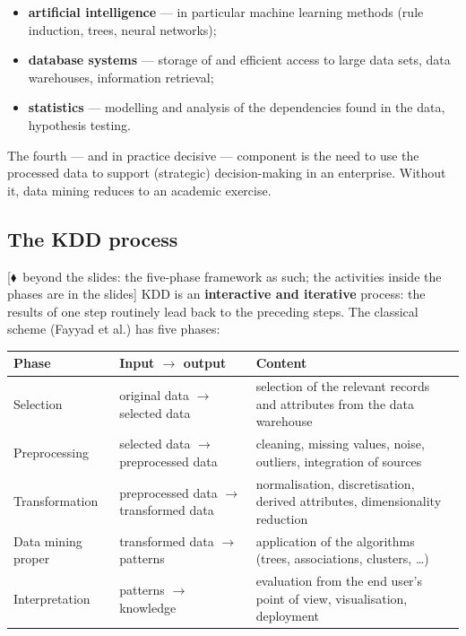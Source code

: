 \documentclass[11pt,a4paper]{article}
\theoremstyle{definition}
\newcommand{\mimoq}[1]{\textcolor{markcol}{\textsf{\footnotesize[$\blacklozenge$~beyond the slides: #1]}}}
\begin{document}
\begin{itemize}
\item \textbf{artificial intelligence} --- in particular machine learning methods (rule
      induction, trees, neural networks);
\item \textbf{database systems} --- storage of and efficient access to large data sets, data
      warehouses, information retrieval;
\item \textbf{statistics} --- modelling and analysis of the dependencies found in the data,
      hypothesis testing.
\end{itemize}

The fourth --- and in practice decisive --- component is the need to use the processed data to
support (strategic) decision-making in an enterprise. Without it, data mining reduces
to an academic exercise.

\subsection{The KDD process}

\mimoq{the five-phase framework as such; the activities inside the phases are in the slides}
KDD is an \textbf{interactive and iterative} process: the results of
one step routinely lead back to the preceding steps. The classical scheme (Fayyad et al.) has
five phases:

\begin{center}
\small
\begin{tabular}{@{}p{3.3cm}p{4.2cm}p{7.6cm}@{}}
\toprule
\textbf{Phase} & \textbf{Input $\to$ output} & \textbf{Content} \\
\midrule
Selection & original data $\to$ selected data & selection of the relevant records and
  attributes from the data warehouse \\
Preprocessing & selected data $\to$ preprocessed data & cleaning, missing values, noise,
  outliers, integration of sources \\
Transformation & preprocessed data $\to$ transformed data & normalisation, discretisation,
  derived attributes, dimensionality reduction \\
Data mining proper & transformed data $\to$ patterns & application of the algorithms (trees,
  associations, clusters, \dots) \\
Interpretation & patterns $\to$ knowledge & evaluation from the end user's point of view,
  visualisation, deployment \\
\bottomrule
\end{tabular}
\end{center}
\end{document}
